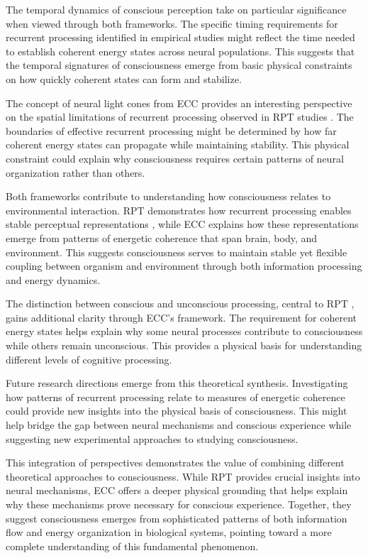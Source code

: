 \begin{refsection}
The temporal dynamics of conscious perception take on particular significance when viewed through both frameworks. The specific timing requirements for recurrent processing identified in empirical studies \cite{Koivisto2010} might reflect the time needed to establish coherent energy states across neural populations. This suggests that the temporal signatures of consciousness emerge from basic physical constraints on how quickly coherent states can form and stabilize.

The concept of neural light cones from ECC provides an interesting perspective on the spatial limitations of recurrent processing observed in RPT studies \cite{Super2001}. The boundaries of effective recurrent processing might be determined by how far coherent energy states can propagate while maintaining stability. This physical constraint could explain why consciousness requires certain patterns of neural organization rather than others.

Both frameworks contribute to understanding how consciousness relates to environmental interaction. RPT demonstrates how recurrent processing enables stable perceptual representations \cite{Lamme2006}, while ECC explains how these representations emerge from patterns of energetic coherence that span brain, body, and environment. This suggests consciousness serves to maintain stable yet flexible coupling between organism and environment through both information processing and energy dynamics.

The distinction between conscious and unconscious processing, central to RPT \cite{Dehaene2006}, gains additional clarity through ECC's framework. The requirement for coherent energy states helps explain why some neural processes contribute to consciousness while others remain unconscious. This provides a physical basis for understanding different levels of cognitive processing.

Future research directions emerge from this theoretical synthesis. Investigating how patterns of recurrent processing relate to measures of energetic coherence could provide new insights into the physical basis of consciousness. This might help bridge the gap between neural mechanisms and conscious experience while suggesting new experimental approaches to studying consciousness.

This integration of perspectives demonstrates the value of combining different theoretical approaches to consciousness. While RPT provides crucial insights into neural mechanisms, ECC offers a deeper physical grounding that helps explain why these mechanisms prove necessary for conscious experience. Together, they suggest consciousness emerges from sophisticated patterns of both information flow and energy organization in biological systems, pointing toward a more complete understanding of this fundamental phenomenon.


\end{refsection}
